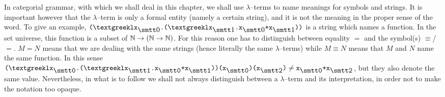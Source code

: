 In categorial grammar, with which we shall deal in this chapter,
we shall use $\lambda$--terms to name meanings for symbols and
strings. It is important however that the $\lambda$--term is only
a formal entity (namely a certain string), and it is not the
meaning in the proper sense of the word. To give an example,
$\mbox{\tt (\stlambda x}_{\snull}\mbox{\tt .(\stlambda x}_{\seins}%
\mbox{\tt .x}_{\snull}\mbox{\tt +x}_{\seins}\mbox{\tt ))}$ is a string which
names a function. In the set universe, this function is a subset
of $\mathbb{N} \rightarrow (\mathbb{N} \rightarrow \mathbb{N})$. For this reason one has to distinguish
between equality $=$ and the symbol(s) $\equiv$/$\boldsymbol{=}$. $M = N$ 
means that we are dealing with the same strings (hence literally the
same $\lambda$--terms) while $M \equiv N$ means that $M$ and
$N$ name the same function. In this sense $\mbox{\tt ({\stlambda}%
x$_{\snull}$.({\stlambda}x$_{\seins}$.x$_{\snull}$+x$_{\seins}$%
))(x$_{\snull}$)(x$_{\szwei}$)} \neq \mbox{\tt x$_{\snull}$+x%
$_{\szwei}$}$, but they also denote the same value. Nevertheless, in 
what is to follow we shall not always distinguish between a 
$\lambda$--term and its interpretation, in order not to make the 
notation too opaque.

